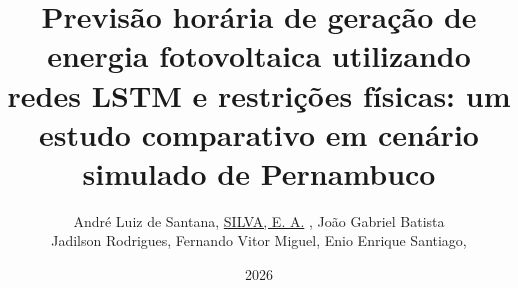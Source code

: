 \title{Previsão horária de geração de energia fotovoltaica utilizando redes LSTM e restrições físicas: um estudo comparativo em cenário simulado de Pernambuco}





\author{
André Luiz de Santana,
    \href{http://lattes.cnpq.br/0529785947460222}{SILVA, E. A.} ,
    João Gabriel Batista\\
    Jadilson Rodrigues, 
    Fernando Vitor Miguel,
    Enio Enrique Santiago,
}

\address{Análise e Desenvolvimento de Sistemas \\Paulista -- PE -- Brasil
}
\date{2026}